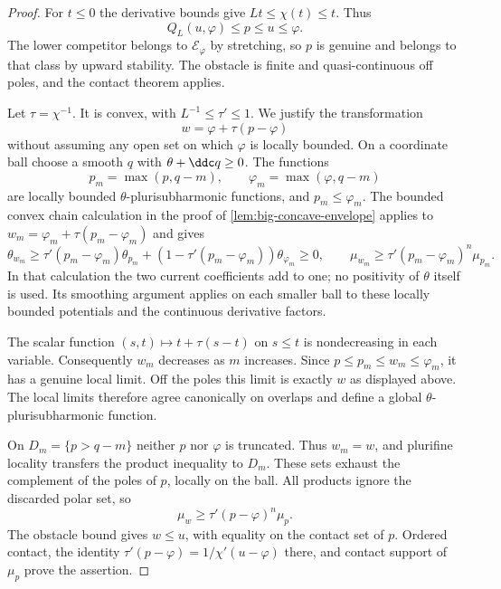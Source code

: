 \begin{proof}
For $t\leq0$ the derivative bounds give $Lt\leq\chi(t)\leq t$. Thus
\[
 Q_L(u,\varphi)\leq p\leq u\leq\varphi.
\]
The lower competitor belongs to $\mathcal E_\varphi$ by stretching, so $p$ is genuine and belongs to that class by upward stability. The obstacle is finite and quasi-continuous off poles, and the contact theorem applies.

Let $\tau=\chi^{-1}$. It is convex, with $L^{-1}\leq\tau'\leq1$. We justify the transformation
\[
 w=\varphi+\tau(p-\varphi)
\]
without assuming any open set on which $\varphi$ is locally bounded. On a coordinate ball choose a smooth $q$ with $\theta+\ddc q\geq0$. The functions
\[
 p_m=\max(p,q-m),\qquad
 \varphi_m=\max(\varphi,q-m)
\]
are locally bounded $\theta$-plurisubharmonic functions, and $p_m\leq\varphi_m$. The bounded convex chain calculation in the proof of \cref{lem:big-concave-envelope} applies to
$w_m=\varphi_m+\tau(p_m-\varphi_m)$ and gives
\[
 \theta_{w_m}\geq\tau'(p_m-\varphi_m)\theta_{p_m}
       +(1-\tau'(p_m-\varphi_m))\theta_{\varphi_m}\geq0,
 \qquad
 \mu_{w_m}\geq\tau'(p_m-\varphi_m)^n\mu_{p_m}.
\]
In that calculation the two current coefficients add to one; no positivity of $\theta$ itself is used. Its smoothing argument applies on each smaller ball to these locally bounded potentials and the continuous derivative factors.

The scalar function $(s,t)\mapsto t+\tau(s-t)$ on $s\leq t$ is nondecreasing in each variable. Consequently $w_m$ decreases as $m$ increases. Since $p\leq p_m\leq w_m\leq\varphi_m$, it has a genuine local limit. Off the poles this limit is exactly $w$ as displayed above. The local limits therefore agree canonically on overlaps and define a global $\theta$-plurisubharmonic function.

On $D_m=\{p>q-m\}$ neither $p$ nor $\varphi$ is truncated. Thus $w_m=w$, and plurifine locality transfers the product inequality to $D_m$. These sets exhaust the complement of the poles of $p$, locally on the ball. All products ignore the discarded polar set, so
\[
 \mu_w\geq\tau'(p-\varphi)^n\mu_p.
\]
The obstacle bound gives $w\leq u$, with equality on the contact set of $p$. Ordered contact, the identity
$\tau'(p-\varphi)=1/\chi'(u-\varphi)$ there, and contact support of $\mu_p$ prove the assertion.
\end{proof}

